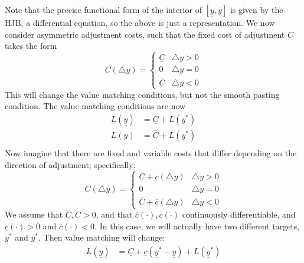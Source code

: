 \documentclass[12pt]{article}
\begin{document}
\begin{itemize}
\begin{center}
    \end{center}
    Note that the precise functional form of the interior of $[\underline{y}, \overline{y}]$ is given by the HJB, a differential equation, so the above is just a representation. We now consider asymmetric adjustment costs, such that the fixed cost of adjustment $C$ takes the form
    \[C(\triangle y) = \begin{cases}
    \underline{C} & \triangle y > 0 \\
    0 & \triangle y = 0 \\
    \overline{C} & \triangle y < 0
    \end{cases}\]
    This will change the value matching conditions, but not the smooth pasting condition. The value matching conditions are now
    \[\begin{split}
        L(\underline{y}) &= \underline{C} + L(y^*) \\
        L(\overline{y}) &= \overline{C} + L(y^*) \\
    \end{split}\]
    Now imagine that there are fixed and variable costs that differ depending on the direction of adjustment; specifically:
    \[C(\triangle y) = \begin{cases}
    \underline{C} + \underline{c}(\triangle y)& \triangle y > 0 \\
    0 & \triangle y = 0 \\
    \overline{C} + \overline{c}(\triangle y) & \triangle y < 0
    \end{cases}\]
    We assume that $\overline{C}, \underline{C} > 0$, and that $\overline{c}(\cdot),\underline{c}(\cdot)$ continuously differentiable, and $\underline{c}(\cdot) > 0$ and $\overline{c}(\cdot) < 0$. In this case, we will actually have two different targets, $\underline{y}^*$ and $\overline{y}^*$. Then value matching will change:
    \[\begin{split}
        L(\underline{y}) &= \underline{C} + \underline{c}(\underline{y}^* - \underline{y}) + L(\underline{y}^*) \\

\end{split}\]
\end{itemize}
\end{document}
